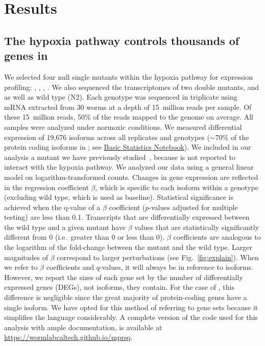 \section*{Results}
\subsection*{The hypoxia pathway controls thousands of genes in \cel{}}
\label{sub:summary}

We selected four null single mutants within the hypoxia pathway for expression
profiling: , , ,
. We also sequenced the transcriptomes of two double mutants,
 and  as well as wild type (N2).
Each genotype was sequenced in triplicate using mRNA extracted from 30 worms at
a depth of 15~million reads per sample. Of these 15~million reads, 50\% of the
reads mapped to the \cel{} genome on average. All samples were analyzed under
normoxic conditions.
We measured differential expression of 19,676 isoforms across all replicates and
genotypes ($\sim$70\% of the protein coding isoforms in \cel{}; see
\href{https://wormlabcaltech.github.io/mprsq/analysis_notebooks/1_basic_stats.html}
{Basic Statistics Notebook}). We included in our analysis a 
mutant we have previously studied~\citep{Angeles-Albores2017a}, because
 is not reported to interact with the hypoxia pathway. We analyzed
our data using a general linear model on logarithm-transformed counts. Changes
in gene expression are reflected in the regression coefficient $\beta$, which is
specific to each isoform within a genotype (excluding wild type, which is used
as baseline). Statistical significance is achieved when the q-value of a $\beta$
coefficient ($p$-values adjusted for multiple testing) are less than 0.1.
Transcripts that are differentially expressed between the wild type and a given
mutant have $\beta$ values that are statistically significantly different from 0
(i.e.\ greater than 0 or less than 0). $\beta$ coefficients are analogous to the
logarithm of the fold-change between the mutant and the wild type. Larger
magnitudes of $\beta$ correspond to larger perturbations (see
Fig.~\ref{fig:explain}). When we refer to $\beta$ coefficients and $q$-values,
it will always be in reference to isoforms. However, we report the sizes of each
gene set by the number of differentially expressed genes (DEGs), not isoforms,
they contain. For the case of \cel{}, this difference is negligible since the
great majority of protein-coding genes have a single isoform. We have opted for
this method of referring to gene sets because it simplifies the language
considerably. A complete version of the code used for this analysis with ample
documentation, is available at \url{https://wormlabcaltech.github.io/mprsq}.


